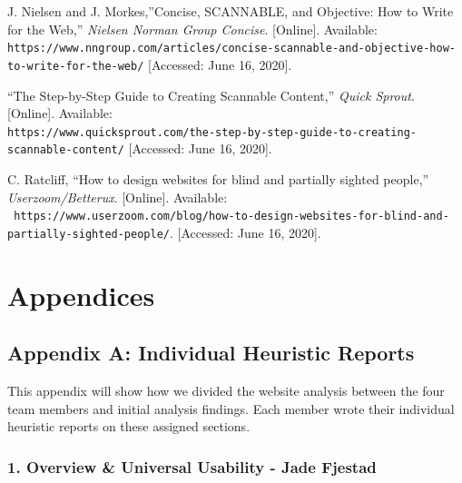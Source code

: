 \documentclass[12pt]{article}
\begin{document}
\begin{thebibliography}{9}
J. Nielsen and J. Morkes,”Concise, SCANNABLE, and Objective: How to Write for the Web,” \textit{Nielsen Norman Group Concise}. [Online]. Available: \\\texttt{https://www.nngroup.com/articles/concise-scannable-and-objective-how-to-write-for-the-web/} [Accessed: June 16, 2020].

“The Step-by-Step Guide to Creating Scannable Content,” \textit{Quick Sprout}. [Online]. Available: \\\texttt{https://www.quicksprout.com/the-step-by-step-guide-to-creating-scannable-content/} [Accessed: June 16, 2020].

C. Ratcliff, “How to design websites for blind and partially sighted people,” \textit{Userzoom/Betterux}. [Online]. Available: \\\texttt{ https://www.userzoom.com/blog/how-to-design-websites-for-blind-and-partially-sighted-people/}. [Accessed: June 16, 2020].

	
	
\end{thebibliography}

\newpage \section{Appendices}
\subsection*{Appendix A: Individual Heuristic Reports}
This appendix will show how we divided the website analysis between the four team members and initial analysis findings. Each member wrote their individual heuristic reports on these assigned sections.

\subsubsection*{1. Overview \& Universal Usability - Jade Fjestad}
\end{document}
